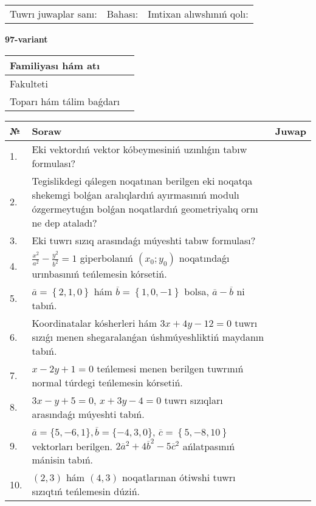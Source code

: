\documentclass{article}
\begin{document}
\vspace{1cm}

\begin{tabular}{lll}
Tuwrı juwaplar sanı: \underline{\hspace{1.5cm}} & 
Bahası: \underline{\hspace{1.5cm}} & 
Imtixan alıwshınıń qolı: \underline{\hspace{2cm}} \\
\end{tabular}

\egroup

\newpage


\textbf{97-variant}\\

\bgroup
\def\arraystretch{1.6} %

\begin{tabular}{|m{5.7cm}|m{9.5cm}|}
\hline
Familiyası hám atı & \\
\hline
Fakulteti  & \\
\hline
Toparı hám tálim baǵdarı  & \\
\hline
\end{tabular}

\vspace{1cm}

\begin{tabular}{|m{0.7cm}|m{10cm}|m{4cm}|}
\hline
№ & Soraw & Juwap \\
\hline
1. & Eki vektordıń vektor kóbeymesiniń uzınlıǵın tabıw formulası? &  \\
\hline
2. & Tegislikdegi qálegen noqatınan berilgen eki noqatqa shekemgi bolǵan aralıqlardıń ayırmasınıń modulı ózgermeytuǵın bolǵan noqatlardıń geometriyalıq ornı ne dep ataladı? &  \\
\hline
3. & Eki tuwrı sızıq arasındaǵı múyeshti tabıw formulası? &  \\
\hline
4. & $\frac{x^2}{a^2}-\frac{y^2}{b^2}=1$ giperbolanıń $(x_0;y_0)$ noqatındaǵı urınbasınıń teńlemesin kórsetiń. &  \\
\hline
5. & $\overline{a}=\left\{ 2, 1, 0 \right\}$ hám $\overline{b}=\left\{ 1, 0,-1 \right\}$ bolsa, $\overline{a}-\overline{b}$ ni tabıń. &  \\
\hline
6. & Koordinatalar kósherleri hám $ 3x+4y-12=0 $ tuwrı sızıǵı menen shegaralanǵan úshmúyeshliktiń maydanın tabıń. &  \\
\hline
7. & $x-2y+1=0$ teńlemesi menen berilgen tuwrınıń normal túrdegi teńlemesin kórsetiń. &  \\
\hline
8. & $3x-y+5=0$, $x+3y-4=0$ tuwrı sızıqları arasındaǵı múyeshti tabıń. &  \\
\hline
9. & $\overline{a}=\{5,-6, 1 \}, \overline{b}=\{-4, 3, 0 \} $, $\overline{c}=\left\{ 5,-8, 10 \right\}$ vektorları berilgen. $2{\overline{a}}^{2}+4{\overline{b}}^{2}-5{\overline{c}}^{2}$ ańlatpasınıń mánisin tabıń. &  \\
\hline
10. & $(2, 3)$ hám $(4, 3)$ noqatlarınan ótiwshi tuwrı sızıqtıń teńlemesin dúziń. &  \\
\hline
\end{tabular}
\end{document}
